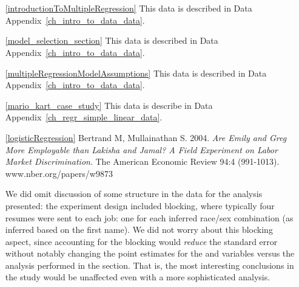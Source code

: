 \section{}
\label{ch_regr_mult_and_log_data}

\begin{itemize}
\item[\ref{introductionToMultipleRegression}]
    This data is described in
    Data Appendix~\ref{ch_intro_to_data_data}.

\item[\ref{model_selection_section}]
    This data is described in
    Data Appendix~\ref{ch_intro_to_data_data}.

\item[\ref{multipleRegressionModelAssumptions}]
    This data is described in
    Data Appendix~\ref{ch_intro_to_data_data}.

\item[\ref{mario_kart_case_study}]
    This data is describe in
    Data Appendix~\ref{ch_regr_simple_linear_data}.

\item[\ref{logisticRegression}]
    Bertrand M, Mullainathan S. 2004.
    \emph{Are Emily and Greg More Employable than Lakisha and Jamal?
    A Field Experiment on Labor Market Discrimination}.
    The American Economic Review 94:4 (991-1013).
        {www.nber.org/papers/w9873}

    We did omit discussion of some structure in
    the data for the analysis presented:
    the experiment design included blocking,
    where typically four resumes were sent to each job:
    one for each inferred race/sex combination
    (as inferred based on the first name).
    We did not worry about this blocking aspect,
    since accounting for the blocking would
    \emph{reduce} the standard error without notably
    changing the point estimates for the
     and  variables
    versus the analysis performed in the section.
    That is, the most interesting conclusions in the
    study would be unaffected even with a more
    sophisticated analysis.


\end{itemize}
